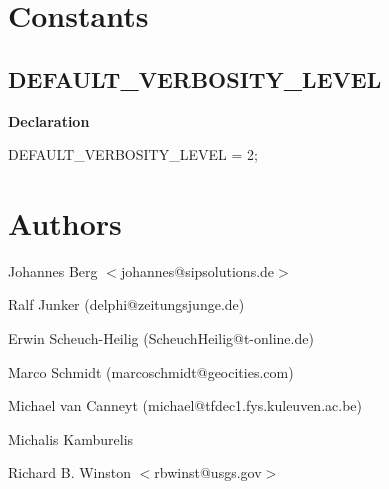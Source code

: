\documentclass{report}
\newif\ifpdf
\begin{document}
\section{Constants}
\ifpdf
\subsection*{\large{\textbf{DEFAULT{\_}VERBOSITY{\_}LEVEL}}\normalsize\hspace{1ex}\hrulefill}
\else
\subsection*{DEFAULT{\_}VERBOSITY{\_}LEVEL}
\fi
\label{PasDoc_Base-DEFAULT_VERBOSITY_LEVEL}
\begin{list}{}{
\setlength{\itemindent}{0cm}
\setlength{\listparindent}{0cm}
\setlength{\leftmargin}{\evensidemargin}
\addtolength{\leftmargin}{\tmplength}
\settowidth{\labelsep}{X}
\addtolength{\leftmargin}{\labelsep}
\setlength{\labelwidth}{\tmplength}
}
\item[\textbf{Declaration}\hfill]
\ifpdf
\begin{flushleft}
\fi
\begin{ttfamily}
DEFAULT{\_}VERBOSITY{\_}LEVEL = 2;\end{ttfamily}

\ifpdf
\end{flushleft}
\fi

\end{list}
\section{Authors}
\par
Johannes Berg {$<$}johannes@sipsolutions.de{$>$}

\par
Ralf Junker (delphi@zeitungsjunge.de)

\par
Erwin Scheuch-Heilig (ScheuchHeilig@t-online.de)

\par
Marco Schmidt (marcoschmidt@geocities.com)

\par
Michael van Canneyt (michael@tfdec1.fys.kuleuven.ac.be)

\par
Michalis Kamburelis

\par
Richard B. Winston {$<$}rbwinst@usgs.gov{$>$}
\end{document}
